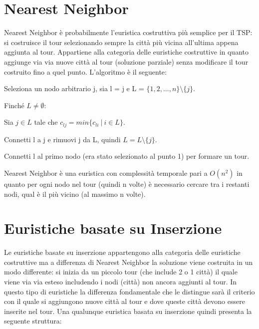 \documentclass[a4paper,12pt]{report}
\begin{document}
\section{Nearest Neighbor} \label{sec:NN}
Nearest Neighbor è probabilmente l'euristica costruttiva più semplice per il TSP: si costruisce il tour selezionando sempre la città più vicina all'ultima appena aggiunta al tour. Appartiene alla categoria delle euristiche costruttive in quanto aggiunge via via nuove città al tour (soluzione parziale) senza modificare il tour costruito fino a quel punto. L'algoritmo è il seguente:

\begin{tcolorbox}[colframe=black,colback=white,boxrule=0.5pt, sharp corners, breakable]
\begin{legal}
  \item Seleziona un nodo arbitrario j, sia l = j e L = $\{1, 2, ..., n\} \setminus \{j\}$.
  \item Finché $L \neq \emptyset$:
  \begin{legal}
    \item Sia $j \in L$ tale che $c_{lj} = min\{c_{li} \  | \  i \in L\}$.
    \item Connetti l a j e rimuovi j da L, quindi $ L = L \setminus \{j\} $.
  \end{legal}
  \item Connetti l al primo nodo (era stato selezionato al punto 1) per formare un tour.
\end{legal}
\end{tcolorbox}
\hfill \break
Nearest Neighbor è una euristica con complessità temporale pari a $O(n^2)$ in quanto per ogni nodo nel tour (quindi n volte) è necessario cercare tra i restanti nodi, qual è il più vicino (al massimo n volte).

\section{Euristiche basate su Inserzione}
Le euristiche basate su inserzione appartengono alla categoria delle euristiche costruttive ma a differenza di Nearest Neighbor la soluzione viene costruita in un modo differente: si inizia da un piccolo tour (che include 2 o 1 città) il quale viene via via esteso includendo i nodi (città) non ancora aggiunti al tour. In questo tipo di euristiche la differenza fondamentale che le distingue sarà il criterio con il quale si aggiungono nuove città al tour e dove queste città devono essere inserite nel tour. Una qualunque euristica basata su inserzione quindi presenta la seguente struttura:
\end{document}
